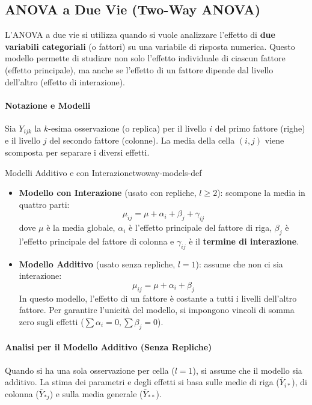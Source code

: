 \subsection{ANOVA a Due Vie (Two-Way ANOVA)}
L'ANOVA a due vie si utilizza quando si vuole analizzare l'effetto di
\textbf{due variabili categoriali} (o fattori) su una variabile di risposta
numerica. Questo modello permette di studiare non solo l'effetto individuale di
ciascun fattore (effetto principale), ma anche se l'effetto di un fattore
dipende dal livello dell'altro (effetto di interazione).

\paragraph{Notazione e Modelli}
Sia \(Y_{ijk}\) la \(k\)-esima osservazione (o replica) per il livello \(i\) del
primo fattore (righe) e il livello \(j\) del secondo fattore (colonne). La media
della cella \((i,j)\) viene scomposta per separare i diversi effetti.

\begin{definizione}{Modelli Additivo e con Interazione}{twoway-models-def}
\begin{itemize}
    \item \textbf{Modello con Interazione} (usato con repliche, \(l \ge 2\)):
    scompone la media in quattro parti:
    \[ \mu_{ij} = \mu + \alpha_i + \beta_j + \gamma_{ij} \]
    dove \(\mu\) è la media globale, \(\alpha_i\) è l'effetto principale del
    fattore di riga, \(\beta_j\) è l'effetto principale del fattore di colonna
    e \(\gamma_{ij}\) è il \textbf{termine di interazione}.
    
    \item \textbf{Modello Additivo} (usato senza repliche, \(l=1\)): assume che
    non ci sia interazione:
    \[ \mu_{ij} = \mu + \alpha_i + \beta_j \]
    In questo modello, l'effetto di un fattore è costante a tutti i livelli
    dell'altro fattore. Per garantire l'unicità del modello, si impongono
    vincoli di somma zero sugli effetti (\(\sum \alpha_i = 0, \sum \beta_j =
    0\)).
\end{itemize}
\end{definizione}

\paragraph{Analisi per il Modello Additivo (Senza Repliche)}
Quando si ha una sola osservazione per cella (\(l=1\)), si assume che il modello
sia additivo. La stima dei parametri e degli effetti si basa sulle medie di riga
(\(\bar{Y}_{i*}\)), di colonna (\(\bar{Y}_{*j}\)) e sulla media generale
(\(\bar{Y}_{**}\)).

